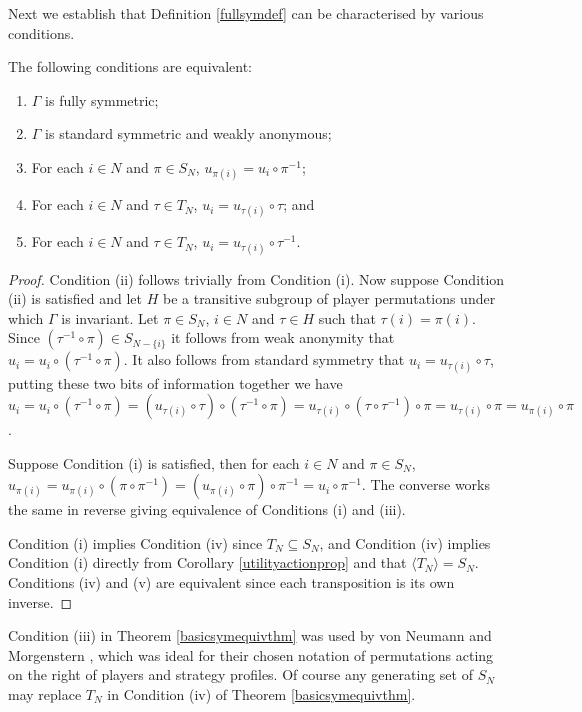 Next we establish that Definition \ref{fullsymdef} can be characterised by various conditions. 

\begin{theorem} \label{basicsymequivthm}
	The following conditions are equivalent:
	\begin{enumerate}
		\item $\Gamma$ is fully symmetric;
		\item $\Gamma$ is standard symmetric and weakly anonymous;
		\item For each $i \in N$ and $\pi \in S_N$, $u_{\pi(i)} = u_i \circ \pi^{-1}$; 
		\item For each $i \in N$ and $\tau \in T_N$, $u_i = u_{\tau(i)} \circ \tau$; and
		\item For each $i \in N$ and $\tau \in T_N$, $u_i = u_{\tau(i)} \circ \tau^{-1}$.
	\end{enumerate}
	
	\begin{proof}		
		Condition (ii) follows trivially from Condition (i). Now suppose Condition (ii) is satisfied and let $H$ be a transitive subgroup of player permutations under which $\Gamma$ is invariant. Let $\pi \in S_N$, $i \in N$ and $\tau \in H$ such that $\tau(i) = \pi(i)$. Since $(\tau^{-1} \circ \pi) \in S_{N-\{i\}}$ it follows from weak anonymity that $u_i = u_i \circ (\tau^{-1} \circ \pi)$. It also follows from standard symmetry that $u_i = u_{\tau(i)} \circ \tau$, putting these two bits of information together we have $u_i = u_i \circ (\tau^{-1} \circ \pi) = (u_{\tau(i)} \circ \tau) \circ (\tau^{-1} \circ \pi) = u_{\tau(i)} \circ (\tau \circ \tau^{-1}) \circ \pi = u_{\tau(i)} \circ \pi = u_{\pi(i)} \circ \pi$.
	
		Suppose Condition (i) is satisfied, then for each $i \in N$ and $\pi \in S_N$, $u_{\pi(i)} = u_{\pi(i)} \circ (\pi \circ \pi^{-1}) = (u_{\pi(i)} \circ \pi) \circ \pi^{-1} = u_i \circ \pi^{-1}$. The converse works the same in reverse giving equivalence of Conditions (i) and (iii). 
		
		Condition (i) implies Condition (iv) since $T_N \subseteq S_N$, and Condition (iv) implies Condition (i) directly from Corollary \ref{utilityactionprop} and that $\langle{T_N}\rangle = S_N$. Conditions (iv) and (v) are equivalent since each transposition is its own inverse.
	\end{proof}
\end{theorem}

Condition (iii) in Theorem \ref{basicsymequivthm} was used by von Neumann and Morgenstern \cite{VNM}, which was ideal for their chosen notation of permutations acting on the right of players and strategy profiles. Of course any generating set of $S_N$ may replace $T_N$ in Condition (iv) of Theorem \ref{basicsymequivthm}.

